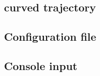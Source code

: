 \documentclass[english,12pt,a4paper,pdftex,elec,utf8]{aaltothesis}
\begin{document}
\subsection*{curved trajectory}

\subsection*{Configuration file}

\subsection*{Console input}

\clearpage
\end{document}
